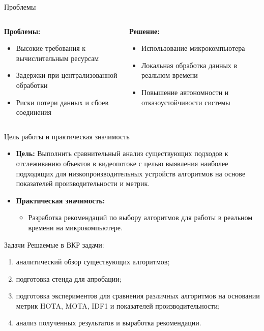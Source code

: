\documentclass{beamer} %
\begin{document}
\begin{frame}{Проблемы}
  \begin{columns}[T]
    \begin{column}{0.45\textwidth}
      \textbf{Проблемы:}
      \begin{itemize}
        \item Высокие требования к вычислительным ресурсам
        \item Задержки при централизованной обработки
        \item Риски потери данных и сбоев соединения
      \end{itemize}
    \end{column}
    \begin{column}{0.45\textwidth}
      \textbf{Решение:}
      \begin{itemize}
        \item Использование микрокомпьютера
        \item Локальная обработка данных в реальном времени
        \item Повышение автономности и отказоустойчивости системы
      \end{itemize}
    \end{column}
  \end{columns}
\end{frame}

\begin{frame}{Цель работы и практическая значимость}
  \begin{itemize}
    \item \textbf{Цель:} Выполнить сравнительный анализ существующих подходов к отслеживанию объектов в
    видеопотоке с целью выявления наиболее подходящих для низкопроизводительных
    устройств алгоритмов на основе показателей производительности и метрик.
    \item \textbf{Практическая значимость:}
      \begin{itemize}
        \item Разработка рекомендаций по выбору алгоритмов для работы в реальном времени на микрокомпьютере.
      \end{itemize}
  \end{itemize}
\end{frame}

\begin{frame}{Задачи}
  Решаемые в ВКР задачи:
  \begin{enumerate}
    \item аналитический обзор существующих алгоритмов;
    \item подготовка стенда для апробации;
    \item подготовка экспериментов для сравнения различных алгоритмов на основании метрик HOTA, MOTA, IDF1 и показателей производительности;
    \item анализ полученных результатов и выработка рекомендации.
\end{enumerate}
\end{frame}
\end{document}
